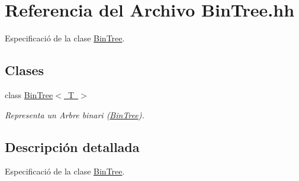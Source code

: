 \hypertarget{_bin_tree_8hh}{}\section{Referencia del Archivo Bin\+Tree.\+hh}
\label{_bin_tree_8hh}


Especificació de la clase \mbox{\hyperlink{class_bin_tree}{Bin\+Tree}}.  


\subsection*{Clases}
\begin{DoxyCompactItemize}
\item 
class \mbox{\hyperlink{class_bin_tree}{Bin\+Tree$<$ T $>$}}
\begin{DoxyCompactList}\small\item\em Representa un Arbre binari (\mbox{\hyperlink{class_bin_tree}{Bin\+Tree}}). \end{DoxyCompactList}\end{DoxyCompactItemize}


\subsection{Descripción detallada}
Especificació de la clase \mbox{\hyperlink{class_bin_tree}{Bin\+Tree}}. 

